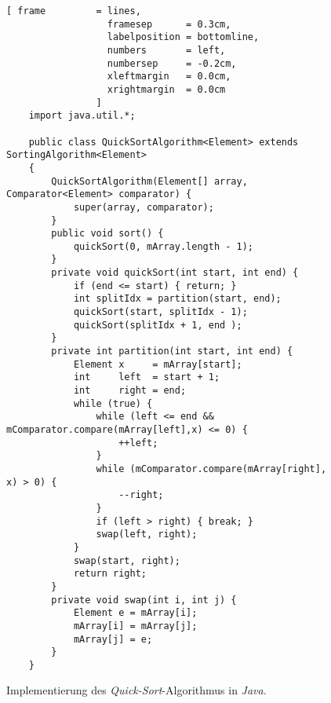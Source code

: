 \begin{figure}[!ht]
  \centering
\begin{Verbatim}[ frame         = lines, 
                  framesep      = 0.3cm, 
                  labelposition = bottomline,
                  numbers       = left,
                  numbersep     = -0.2cm,
                  xleftmargin   = 0.0cm,
                  xrightmargin  = 0.0cm
                ]
    import java.util.*;
    
    public class QuickSortAlgorithm<Element> extends SortingAlgorithm<Element>
    {    
        QuickSortAlgorithm(Element[] array, Comparator<Element> comparator) {
            super(array, comparator);
        }
        public void sort() {
            quickSort(0, mArray.length - 1); 
        }
        private void quickSort(int start, int end) {
            if (end <= start) { return; }
            int splitIdx = partition(start, end);
            quickSort(start, splitIdx - 1);  
            quickSort(splitIdx + 1, end );    
        }
        private int partition(int start, int end) {
            Element x     = mArray[start];
            int     left  = start + 1;
            int     right = end;
            while (true) {
                while (left <= end && mComparator.compare(mArray[left],x) <= 0) {
                    ++left;
                }
                while (mComparator.compare(mArray[right], x) > 0) {
                    --right;
                }
                if (left > right) { break; }
                swap(left, right);
            }
            swap(start, right);
            return right;    
        }
        private void swap(int i, int j) {
            Element e = mArray[i];
            mArray[i] = mArray[j];
            mArray[j] = e;
        }
    }
\end{Verbatim}
\vspace*{-0.3cm}
  \caption{Implementierung des \emph{Quick-Sort}-Algorithmus in \textsl{Java}.}
  \label{fig:QuickSort.java}
\end{figure}

